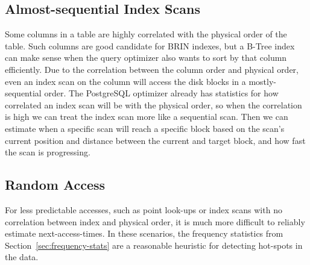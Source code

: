 

\subsection{Almost-sequential Index Scans\label{sec:idx_seq}}


Some columns in a table are highly correlated with the physical order of the table. Such columns are good candidate for BRIN indexes, but a B-Tree index can make sense when the query optimizer also wants to sort by that column efficiently. Due to the correlation between the column order and physical order, even an index scan on the column will access the disk blocks in a mostly-sequential order. The PostgreSQL optimizer already has statistics for how correlated an index scan will be with the physical order, so when the correlation is high we can treat the index scan more like a sequential scan. Then we can estimate when a specific scan will reach a specific block based on the scan's current position and distance between the current and target block, and how fast the scan is progressing.




\subsection{Random Access}

For less predictable accesses, such as point look-ups or index scans with no correlation between index and physical order, it is much more difficult to reliably estimate next-access-times. In these scenarios, the frequency statistics from Section~\ref{sec:frequency-stats} are a reasonable heuristic for detecting hot-spots in the data.
